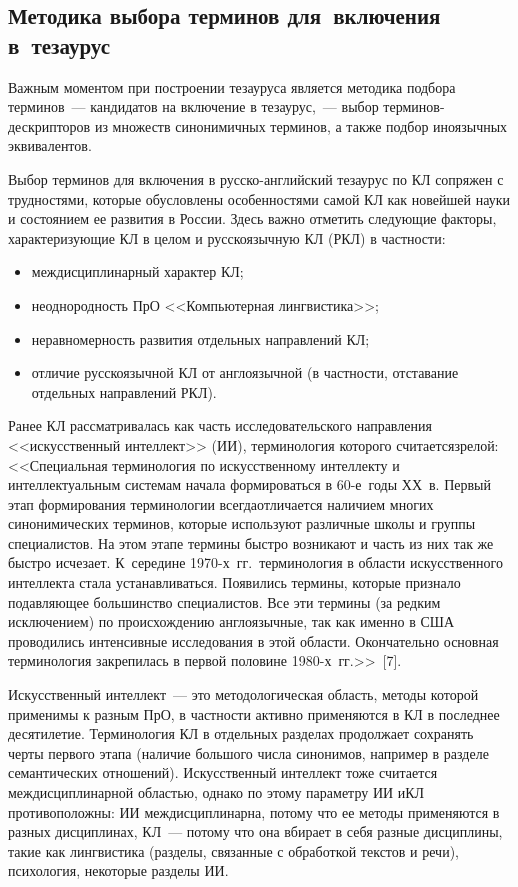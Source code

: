 \begin{multicols}{2}
\section{Методика выбора терминов для~включения в~тезаурус}

  Важным моментом при построении тезауруса является методика подбора 
  терминов~--- кандидатов на включение в тезаурус,~--- выбор терминов-дескрипторов из 
множеств синонимичных терминов, а также подбор иноязычных эквивалентов. 
  
  Выбор терминов для включения в русско-анг\-лий\-ский тезаурус по КЛ сопряжен с 
трудностями, которые обусловлены особенностями самой КЛ как новейшей науки и 
состоянием ее развития в России. Здесь важно отметить следующие факторы, 
характеризующие КЛ в целом и русскоязычную КЛ (РКЛ) в частности:
  \begin{itemize}
\item  междисциплинарный характер КЛ;
  \item неоднородность ПрО <<Компьютерная лингвистика>>;
  \item неравномерность развития отдельных на\-прав\-ле\-ний КЛ;
  \item отличие русскоязычной КЛ от англоязычной (в частности, отставание отдельных 
направлений РКЛ).
  \end{itemize}
  
  Ранее КЛ рассматривалась как часть исследовательского направления <<искусственный 
интеллект>> (ИИ), терминология которого считается\linebreak зрелой: <<Специальная терминология 
по искусственному интеллекту и интеллектуальным системам начала формироваться в 
  60-е~годы ХХ~в. Первый этап формирования терминологии всегда\linebreak отличается наличием 
многих синонимических терминов, которые используют различные школы и группы 
специалистов. На этом этапе термины быстро возникают и часть из них так же быстро 
исчезает. К~середине 1970-х~гг.\ терминология в области искусственного интеллекта стала 
уста\-нав\-ли\-вать\-ся. Появились термины, которые признало подавляющее большинство 
специалистов. Все эти термины (за редким исключением) по происхождению англоязычные, 
так как именно в США проводились интенсивные исследования в этой области. 
Окончательно основная терминология закрепилась в первой половине 1980-х~гг.>>~[7]. 
  
  Искусственный интеллект~--- это методологическая область, методы которой применимы к разным ПрО, в 
част\-ности активно применяются в КЛ в последнее десятилетие. Терминология КЛ в 
отдельных разделах продолжает сохранять черты первого этапа (наличие большого числа 
синонимов, например в разделе семантических отношений). Искусственный интеллект тоже считается 
междисциплинарной областью, однако по этому параметру ИИ и\linebreak КЛ противоположны: ИИ 
междисциплинарна, потому что ее методы применяются в разных дис\-цип\-ли\-нах, КЛ~--- 
потому что она вбирает в себя разные дисциплины, такие как лингвистика (разделы, 
связанные с обработкой текстов и речи), психология, некоторые разделы ИИ.
   

\end{multicols}
